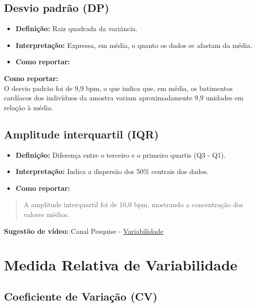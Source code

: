 \documentclass[
]{book}
\providecommand{\tightlist}{%
  \setlength{\itemsep}{0pt}\setlength{\parskip}{0pt}}
\begin{document}
\subsection{Desvio padrão (DP)}\label{desvio-padruxe3o-dp}

\begin{itemize}
\tightlist
\item
  \textbf{Definição:} Raiz quadrada da variância.\\
\item
  \textbf{Interpretação:} Expressa, em média, o quanto os dados se afastam da média.\\
\item
  \textbf{Como reportar:}
\end{itemize}

\textbf{Como reportar:}\\
O desvio padrão foi de 9,9 bpm, o que indica que, em média, os batimentos cardíacos dos indivíduos da amostra variam aproximadamente 9,9 unidades em relação à média.

\subsection{Amplitude interquartil (IQR)}\label{amplitude-interquartil-iqr}

\begin{itemize}
\tightlist
\item
  \textbf{Definição:} Diferença entre o terceiro e o primeiro quartis (Q3 - Q1).\\
\item
  \textbf{Interpretação:} Indica a dispersão dos 50\% centrais dos dados.\\
\item
  \textbf{Como reportar:}
\end{itemize}

\begin{quote}
A amplitude interquartil foi de 10,0 bpm, mostrando a concentração dos valores médios.
\end{quote}

\textbf{Sugestão de vídeo:} Canal Pesquise - \href{https://youtu.be/sISPcOIcwXs}{Variabilidade}

\section{Medida Relativa de Variabilidade}\label{medida-relativa-de-variabilidade}

\subsection{Coeficiente de Variação (CV)}\label{coeficiente-de-variauxe7uxe3o-cv}
\end{document}
